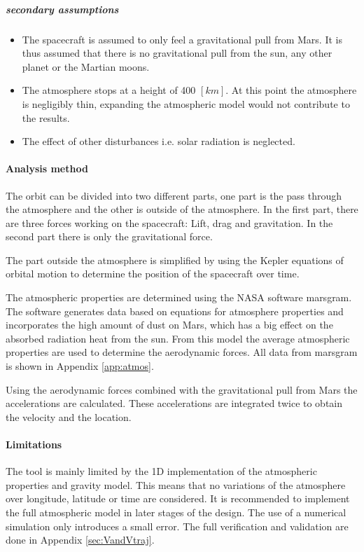  \subparagraph{secondary assumptions}
 \begin{itemize}
 \item The spacecraft is assumed to only feel a gravitational pull from Mars. It is thus assumed that there is no gravitational pull from the sun, any other planet or the Martian moons.
 \item The atmosphere stops at a height of 400 $\left[km\right]$. At this point the atmosphere is negligibly thin, expanding the atmospheric model would not contribute to the results.
 \item The effect of other disturbances i.e. solar radiation is neglected.
 \end{itemize}

\paragraph{Analysis method}
The orbit can be divided into two different parts, one part is the pass through the atmosphere and the other is outside of the atmosphere. In the first part, there are three forces working on the spacecraft: Lift, drag and gravitation. In the second part there is only the gravitational force.

The part outside the atmosphere is simplified by using the Kepler equations of orbital motion to determine the position of the spacecraft over time.

The atmospheric properties are determined using the NASA software \gls{marsgram}. The software generates data based on equations for atmosphere properties and incorporates the high amount of dust on Mars, which has a big effect on the absorbed radiation heat from the sun. From this model the average atmospheric properties are used to determine the aerodynamic forces. All data from \gls{marsgram} is shown in Appendix \ref{app:atmos}. 

Using the aerodynamic forces combined with the gravitational pull from Mars the accelerations are calculated. These accelerations are integrated twice to obtain the velocity and the location.

\paragraph{Limitations}
The tool is mainly limited by the 1D implementation of the atmospheric properties and gravity model. This means that no variations of the atmosphere over longitude, latitude or time are considered. It is recommended to implement the full atmospheric model in later stages of the design. The use of a numerical simulation only introduces a small error. The full verification and validation are done in Appendix \ref{sec:VandVtraj}.